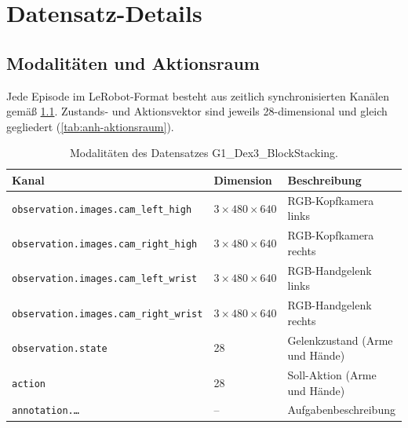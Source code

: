 
\chapter{Datensatz-Details}
\label{anh:datensatz}

\section{Modalitäten und Aktionsraum}
\label{anh:episodenstruktur}

Jede Episode im LeRobot-Format besteht aus zeitlich synchronisierten Kanälen
gemäß \cref{tab:anh-modalitaeten}. Zustands- und Aktionsvektor sind jeweils
28-dimensional und gleich gegliedert (\cref{tab:anh-aktionsraum}).

\begin{table}[htb]
  \centering
  \begin{tabularx}{\linewidth}{llX}
    \toprule
    Kanal & Dimension & Beschreibung \\
    \midrule
    \texttt{observation.images.cam\_left\_high}  & $3\times480\times640$ & RGB-Kopfkamera links \\
    \texttt{observation.images.cam\_right\_high} & $3\times480\times640$ & RGB-Kopfkamera rechts \\
    \texttt{observation.images.cam\_left\_wrist} & $3\times480\times640$ & RGB-Handgelenk links \\
    \texttt{observation.images.cam\_right\_wrist}& $3\times480\times640$ & RGB-Handgelenk rechts \\
    \texttt{observation.state}                   & 28 & Gelenkzustand (Arme und Hände) \\
    \texttt{action}                              & 28 & Soll-Aktion (Arme und Hände) \\
    \texttt{annotation.\dots}                    & -- & Aufgabenbeschreibung \\
    \bottomrule
  \end{tabularx}
  \caption{Modalitäten des Datensatzes G1\_Dex3\_BlockStacking.}
  \label{tab:anh-modalitaeten}
\end{table}

